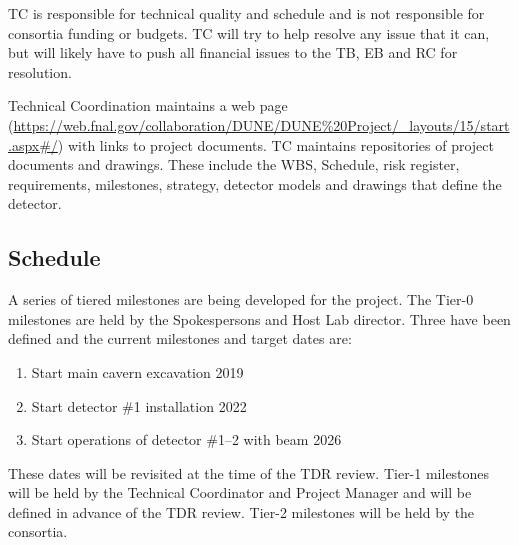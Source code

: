 TC is responsible for technical quality and schedule and is not
responsible for consortia funding or budgets.  TC will try to help
resolve any issue that it can, but will likely have to push all
financial issues to the TB, EB and RC for resolution.

Technical Coordination maintains a web page
(\url{https://web.fnal.gov/collaboration/DUNE/DUNE\%20Project/\_layouts/15/start.aspx\#/})
with links to project documents. TC maintains repositories of project
documents and drawings. These include the WBS, Schedule, risk
register, requirements, milestones, strategy, detector models and
drawings that define the  detector.


\subsection{Schedule}
\label{sec:fdsp-coord-controls}

A series of tiered milestones are being developed for the 
project. The Tier-0 milestones are held by the Spokespersons and Host
Lab director. Three have been defined and the current milestones and
target dates are:
\begin{enumerate}
\item Start main cavern excavation \hspace{2.1in} 2019
\item Start detector \#1 installation \hspace{2.1in} 2022
\item Start operations of detector \#1--2 with beam \hspace{1in} 2026
\end{enumerate}
These dates will be revisited at the time of the TDR review.  Tier-1
milestones will be held by the Technical Coordinator and  Project
Manager and will be defined in advance of the TDR review. Tier-2
milestones will be held by the consortia.

